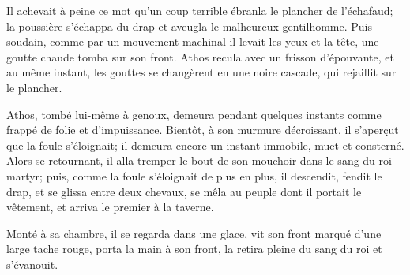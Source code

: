 Il achevait à peine ce mot qu'un coup terrible ébranla le plancher de l'échafaud; la poussière s'échappa du drap et aveugla le malheureux gentilhomme. Puis soudain, comme par un mouvement machinal il levait les yeux et la tête, une goutte chaude tomba sur son front. Athos recula avec un frisson d'épouvante, et au même instant, les gouttes se changèrent en une noire cascade, qui rejaillit sur le plancher.

Athos, tombé lui-même à genoux, demeura pendant quelques instants comme frappé de folie et d'impuissance. Bientôt, à son murmure décroissant, il s'aperçut que la foule s'éloignait; il demeura encore un instant immobile, muet et consterné. Alors se retournant, il alla tremper le bout de son mouchoir dans le sang du roi martyr; puis, comme la foule s'éloignait de plus en plus, il descendit, fendit le drap, et se glissa entre deux chevaux, se mêla au peuple dont il portait le vêtement, et arriva le premier à la taverne.

Monté à sa chambre, il se regarda dans une glace, vit son front marqué d'une large tache rouge, porta la main à son front, la retira pleine du sang du roi et s'évanouit.